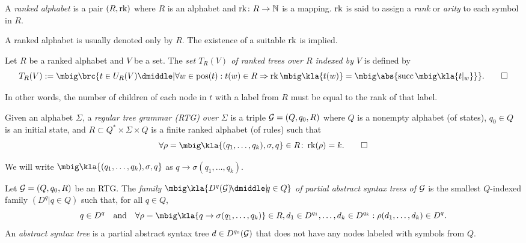 \begin{definition}
 A \emph{ranked alphabet} is a pair $(R,\operatorname{rk})$ where $R$ is an alphabet and
 $\operatorname{rk}\colon R\to\mathbb N$ is a mapping. $\operatorname{rk}$ is said to assign a \emph{rank} or
 \emph{arity} to each symbol in $R$.
\end{definition}

A ranked alphabet is usually denoted only by $R$. The existence of a suitable
$\operatorname{rk}$ is implied.

\begin{definition}
 Let $R$ be a ranked alphabet and $V$ be a set. The \emph{set $T_R(V)$ of
 ranked trees over $R$ indexed by $V$} is defined by
 \[
  T_R(V) := \mbig\brc{t \in U_R(V) \dmiddle| \forall w\in\pos(t): t(w)\in R\Rightarrow \rk\mbig\kla{t(w)} = \mbig\abs{\osucc\mbig\kla{t|_w}}}.
  \qedhere
 \]
\end{definition}

In other words, the number of children of each node in $t$ with a label from
$R$ must be equal to the rank of that label.

\begin{definition}
 Given an alphabet $\Sigma$, a \emph{regular tree grammar (RTG) over $\Sigma$}
 is a triple $\mathcal G = (Q,q_0,R)$ where $Q$ is a nonempty alphabet (of states),
 $q_0\in Q$ is an initial state, and $R\subset Q^*\times\Sigma\times Q$ is a
 finite ranked alphabet (of rules) such that
 \[
  \forall \rho = \mbig\kla{(q_1,\ldots,q_k),\sigma,q}\in R\colon \rk(\rho) = k.
  \qedhere
 \]
\end{definition}

We will write $\mbig\kla{(q_1,\ldots,q_k),\sigma,q}$ as $q\to\sigma(q_1,\ldots,q_k)$.

\begin{definition}
 Let $\mathcal G=(Q,q_0,R)$ be an RTG. The \emph{family
 $\mbig\kla{D^q(\ug)\!\dmiddle|\!q\in Q}$ of partial abstract syntax trees of
 $\mathcal G$} is the smallest $Q$-indexed family $(D^q|q\in Q)$ such that, for all
 $q\in Q$,
 \[
  q \in D^q \quad\text{and}\quad \forall \rho=\mbig\kla{q\to\sigma(q_1,\ldots,q_k)}\in R,d_1\in D^{q_1},\ldots,d_k\in D^{q_k}: \rho(d_1,\ldots,d_k) \in D^q.
 \]
 An \emph{abstract syntax tree} is a partial abstract syntax tree $d\in
 D^{q_0}(\mathcal G)$ that does not have any nodes labeled with symbols from $Q$.
\end{definition}

